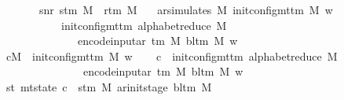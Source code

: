 \begin{isabellebody}
\ \ \ \ \ \ \ snr{\isacharcolon}{\kern0pt}\ {\isachardoublequoteopen}s{\isacharunderscore}{\kern0pt}tm\ M\ {\isasymnoteq}\ r{\isacharunderscore}{\kern0pt}tm\ M{\isachardoublequoteclose}\isanewline
\ \ \ {\isachardoublequoteopen}ar{\isacharunderscore}{\kern0pt}simulates\ M\ {\isacharparenleft}{\kern0pt}init{\isacharunderscore}{\kern0pt}config{\isacharunderscore}{\kern0pt}mttm\ M\ w{\isacharparenright}{\kern0pt}\isanewline
\ \ \ \ \ \ \ \ \ \ \ {\isacharparenleft}{\kern0pt}init{\isacharunderscore}{\kern0pt}config{\isacharunderscore}{\kern0pt}mttm\ {\isacharparenleft}{\kern0pt}alphabet{\isacharunderscore}{\kern0pt}reduce\ M{\isacharparenright}{\kern0pt}\isanewline
\ \ \ \ \ \ \ \ \ \ \ \ \ \ {\isacharparenleft}{\kern0pt}encode{\isacharunderscore}{\kern0pt}input{\isacharunderscore}{\kern0pt}ar\ {\isacharparenleft}{\kern0pt}{\isasymGamma}{\isacharunderscore}{\kern0pt}tm\ M{\isacharparenright}{\kern0pt}\ {\isacharparenleft}{\kern0pt}bl{\isacharunderscore}{\kern0pt}tm\ M{\isacharparenright}{\kern0pt}\ w{\isacharparenright}{\kern0pt}{\isacharparenright}{\kern0pt}{\isachardoublequoteclose}\isanewline
%
\isadelimproof
%
\endisadelimproof
%
\isatagproof
{}\isamarkupfalse%
\ {\isacharminus}{\kern0pt}\isanewline
\ \ \isamarkupfalse%
\ {\isacharquery}{\kern0pt}cM\ {\isacharequal}{\kern0pt}\ {\isachardoublequoteopen}init{\isacharunderscore}{\kern0pt}config{\isacharunderscore}{\kern0pt}mttm\ M\ w{\isachardoublequoteclose}\isanewline
\ \ \isamarkupfalse%
\ {\isacharquery}{\kern0pt}c{\isacharprime}{\kern0pt}\ {\isacharequal}{\kern0pt}\ {\isachardoublequoteopen}init{\isacharunderscore}{\kern0pt}config{\isacharunderscore}{\kern0pt}mttm\ {\isacharparenleft}{\kern0pt}alphabet{\isacharunderscore}{\kern0pt}reduce\ M{\isacharparenright}{\kern0pt}\isanewline
\ \ \ \ \ \ \ \ \ \ \ \ \ \ \ {\isacharparenleft}{\kern0pt}encode{\isacharunderscore}{\kern0pt}input{\isacharunderscore}{\kern0pt}ar\ {\isacharparenleft}{\kern0pt}{\isasymGamma}{\isacharunderscore}{\kern0pt}tm\ M{\isacharparenright}{\kern0pt}\ {\isacharparenleft}{\kern0pt}bl{\isacharunderscore}{\kern0pt}tm\ M{\isacharparenright}{\kern0pt}\ w{\isacharparenright}{\kern0pt}{\isachardoublequoteclose}\isanewline
\ \ \isamarkupfalse%
\ st{\isacharcolon}{\kern0pt}\ {\isachardoublequoteopen}mt{\isacharunderscore}{\kern0pt}state\ {\isacharquery}{\kern0pt}c{\isacharprime}{\kern0pt}\ {\isacharequal}{\kern0pt}\ {\isacharparenleft}{\kern0pt}s{\isacharunderscore}{\kern0pt}tm\ M{\isacharcomma}{\kern0pt}\ ar{\isacharunderscore}{\kern0pt}init{\isacharunderscore}{\kern0pt}stage\ {\isacharparenleft}{\kern0pt}bl{\isacharunderscore}{\kern0pt}tm\ M{\isacharparenright}{\kern0pt}{\isacharparenright}{\kern0pt}{\isachardoublequoteclose}\isanewline

\end{isabellebody}
